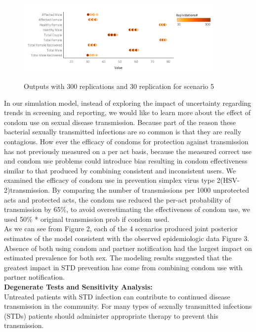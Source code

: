 \documentclass{article}
\begin{document}
\begin{normalsize}
 \begin{figure}[H]
    \caption{Outputs with 300 replications and 30 replication for scenario 5}
\includegraphics[width=0.92\textwidth]{plt6.png}
\label{fig:plt6}
\end{figure}
 In our simulation model, instead of exploring the impact of uncertainty regarding trends in screening and reporting, we would like to learn more about the effect of condom use on sexual disease transmission. Because part of the reason these bacterial sexually transmitted infections are so common is that they are really contagious\cite{warner2006}.
 How ever the efficacy of condoms for protection against transmission has not previously measured on a per act basis, because the measured correct use and condom use problems could introduce bias resulting in condom effectiveness similar to that produced by combining consistent and inconsistent users.
 We examined the efficacy of condom use in prevention simplex virus type 2(HSV-2)transmission\cite{magaret2015}. By comparing the number of transmissions per 1000 unprotected acts and protected acts, the condom use reduced the per-act probability of transmission by 65\%, to avoid overestimating the effectiveness of condom use, we used 50\% * original transmission prob if condom used. \\
 

 
 As we can see from Figure 2, each of the 4 scenarios produced joint posterior estimates of the model consistent with the observed epidemiologic data Figure 3. Absence of both using condom and partner notification had the largest impact on estimated prevalence for both sex. The modeling results suggested that the greatest impact in STD prevention has come from combining condom use with partner notification.\\
 
\textbf{Degenerate Tests and Sensitivity Analysis:}\\

Untreated patients with STD infection can contribute to continued disease transmission in the community. For many types of sexually transmitted infections (STDs) patients should administer appropriate therapy to prevent this transmission. \\


\end{normalsize}
\end{document}
